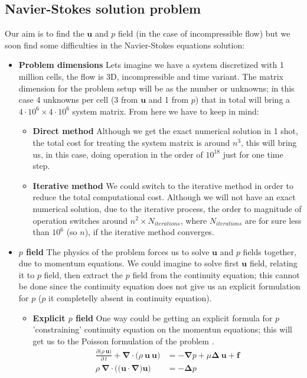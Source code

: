 \subsection{Navier-Stokes solution problem} \label{sec:NSsolProb}
Our aim is to find the $\boldsymbol{u}$ and $p$ field (in the case of incompressible flow) but we soon find some difficulties in the Navier-Stokes equations solution:
\begin{itemize}
    \item \textbf{Problem dimensions} Lets imagine we have a system discretized with 1 million cells, the flow is 3D, incompressible and time variant. The matrix dimension for the problem setup will be as the number or unknowns; in this case 4 unknowns per cell (3 from $\boldsymbol{u}$ and 1 from $p$) that in total will bring a $4 \cdot 10^6 \times 4 \cdot 10^6$ system matrix. From here we have to keep in mind:
        \begin{itemize}
            \item \textbf{Direct method} Although we get the exact numerical solution in 1 shot, the total cost for treating the system matrix is around $n^3$, this will bring us, in this case, doing operation in the order of $10^{18}$ just for one time step.
            \item \textbf{Iterative method} We could switch to the iterative method in order to reduce the total computational cost. Although we will not have an exact numerical solution, due to the iterative process, the order to magnitude of operation switches around $n^2 \times N_{iterations}$, where $N_{iterations}$ are for sure less than $10^6$ (so $n$), if the iterative method converges.
        \end{itemize} 
    \item \textbf{$p$ field} The physics of the problem forces us to solve $\boldsymbol{u}$ and $p$ fields together, due to momentum equations. We could imagine to solve first $\boldsymbol{u}$ field, relating it to $p$ field, then extract the $p$ field from the continuity equation; this cannot be done since the continuity equation does not give us an explicit formulation for $p$ ($p$ it completelly absent in continuity equation). 
        \begin{itemize}
            \item \textbf{Explicit $p$ field} One way could be getting an explicit formula for $p$ 'constraining' continuity equation on the momentun equations; this will get us to the Poisson formulation of the problem \cite{poisson}. 
            \begin{align}
                \frac{\partial \big( \rho \ \boldsymbol{u} \big)}{\partial \ t} + \boldsymbol{\nabla} \cdot \big( \rho \ \boldsymbol{u} \ \boldsymbol{u} \big) & = - \boldsymbol{\nabla} p + \mu \boldsymbol{\Delta} \ \boldsymbol{u} + \boldsymbol{f} \\ 
                \rho \ \boldsymbol{\nabla} \cdot \Big( \big( \boldsymbol{u} \cdot \boldsymbol{\nabla} \big) \boldsymbol{u} \Big) & = - \boldsymbol{\Delta} p
                \label{eqn:poisson}
            \end{align}
                

\end{itemize}
\end{itemize}
